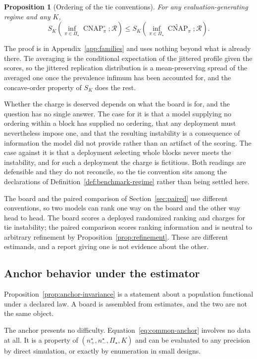 \documentclass[11pt]{article}
\newcommand{\CNAP}{\operatorname{CNAP}}
\newcommand{\Regime}{\mathcal{R}}
\newcommand{\PSet}{\Pi_\star}
\newcommand{\CNAPta}{\widetilde{\CNAP}}
\newcommand{\CNAPj}{\CNAP^{\circ}}
\newtheorem{proposition}{Proposition}
\theoremstyle{remark}
\begin{document}
\begin{proposition}[Ordering of the tie conventions]
\label{prop:convention-order}
For any evaluation-generating regime and any $K$,
\[
S_K
\left(
\inf_{\pi\in\PSet}\CNAPj_\pi;\Regime
\right)
\leq
S_K
\left(
\inf_{\pi\in\PSet}\CNAPta_\pi;\Regime
\right).
\]
\end{proposition}

The proof is in Appendix~\ref{app:families} and uses nothing beyond what is already there. Tie averaging is the conditional expectation of the jittered profile given the scores, so the jittered replication distribution is a mean-preserving spread of the averaged one once the prevalence infimum has been accounted for, and the concave-order property of $S_K$ does the rest.

Whether the charge is deserved depends on what the board is for, and the question has no single answer. The case for it is that a model supplying no ordering within a block has supplied no ordering, that any deployment must nevertheless impose one, and that the resulting instability is a consequence of information the model did not provide rather than an artifact of the scoring. The case against it is that a deployment selecting whole blocks never meets the instability, and for such a deployment the charge is fictitious. Both readings are defensible and they do not reconcile, so the tie convention sits among the declarations of Definition~\ref{def:benchmark-regime} rather than being settled here.

The board and the paired comparison of Section~\ref{sec:paired} use different conventions, so two models can rank one way on the board and the other way head to head. The board scores a deployed randomized ranking and charges for tie instability; the paired comparison scores ranking information and is neutral to arbitrary refinement by Proposition~\ref{prop:refinement}. These are different estimands, and a report giving one is not evidence about the other.

\subsection{Anchor behavior under the estimator}
\label{sec:anchor-estimation}

Proposition~\ref{prop:anchor-invariance} is a statement about a population functional under a declared law. A board is assembled from estimates, and the two are not the same object.

The anchor presents no difficulty. Equation~\eqref{eq:common-anchor} involves no data at all. It is a property of $(n^\star_+,n^\star_-,\PSet,K)$ and can be evaluated to any precision by direct simulation, or exactly by enumeration in small designs.
\end{document}
